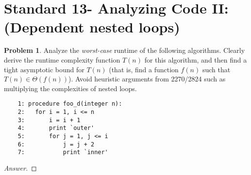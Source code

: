 \documentclass[11pt]{article}
\theoremstyle{definition}
\theoremstyle{definition}
\newtheorem{required}{Problem}
\theoremstyle{definition}
\begin{document}
\section{Standard 13- Analyzing Code II: (Dependent nested loops)}
\begin{required}


Analyze the \textit{worst-case} runtime of the following algorithms. Clearly derive the runtime complexity function $T(n)$ for this algorithm, and then find a tight asymptotic bound for $T(n)$ (that is, find a function $f(n)$ such that $T(n) \in \Theta(f(n))$). Avoid heuristic arguments from 2270/2824 such as multiplying the complexities of nested loops.

\begin{verbatim}
	1: procedure foo_d(integer n):
	2:   for i = 1, i <= n
	3:       i = i + 1
	4:       print `outer'
	5:       for j = 1, j <= i
	6:           j = j + 2
	7:           print `inner'
\end{verbatim}




\end{required}

\begin{proof}[Answer]
\end{proof}
\end{document}
